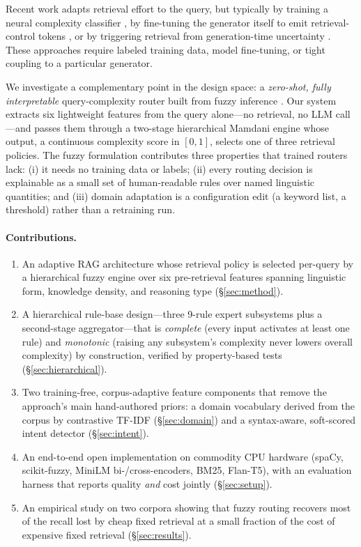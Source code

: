 \documentclass[11pt]{article}
\begin{document}
Recent work adapts retrieval effort to the query, but typically by training a
neural complexity classifier \citep{jeong2024adaptive}, by fine-tuning the
generator itself to emit retrieval-control tokens \citep{asai2024selfrag}, or
by triggering retrieval from generation-time uncertainty
\citep{jiang2023flare}. These approaches require labeled training data,
model fine-tuning, or tight coupling to a particular generator.

We investigate a complementary point in the design space: a \emph{zero-shot,
fully interpretable} query-complexity router built from fuzzy inference
\citep{zadeh1965fuzzy,mamdani1975experiment}. Our system extracts six
lightweight features from the query alone---no retrieval, no LLM call---and
passes them through a two-stage hierarchical Mamdani engine whose output, a
continuous complexity score in $[0,1]$, selects one of three retrieval
policies. The fuzzy formulation contributes three properties that trained
routers lack: (i) it needs no training data or labels; (ii) every routing
decision is explainable as a small set of human-readable rules over named
linguistic quantities; and (iii) domain adaptation is a configuration edit (a
keyword list, a threshold) rather than a retraining run.

\paragraph{Contributions.}
\begin{enumerate}
  \item An adaptive RAG architecture whose retrieval policy is selected
        per-query by a hierarchical fuzzy engine over six pre-retrieval
        features spanning linguistic form, knowledge density, and reasoning
        type (\S\ref{sec:method}).
  \item A hierarchical rule-base design---three 9-rule expert subsystems plus
        a second-stage aggregator---that is \emph{complete} (every input
        activates at least one rule) and \emph{monotonic} (raising any
        subsystem's complexity never lowers overall complexity) by
        construction, verified by property-based tests
        (\S\ref{sec:hierarchical}).
  \item Two training-free, corpus-adaptive feature components that remove the
        approach's main hand-authored priors: a domain vocabulary derived from
        the corpus by contrastive TF-IDF (\S\ref{sec:domain}) and a
        syntax-aware, soft-scored intent detector (\S\ref{sec:intent}).
  \item An end-to-end open implementation on commodity CPU hardware (spaCy,
        scikit-fuzzy, MiniLM bi-/cross-encoders, BM25, Flan-T5), with an
        evaluation harness that reports quality \emph{and} cost jointly
        (\S\ref{sec:setup}).
  \item An empirical study on two corpora showing that fuzzy routing recovers
        most of the recall lost by cheap fixed retrieval at a small fraction
        of the cost of expensive fixed retrieval (\S\ref{sec:results}).
\end{enumerate}
\end{document}
